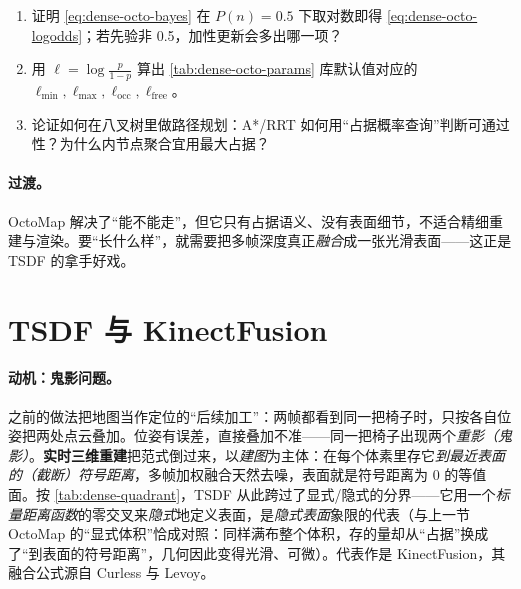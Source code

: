 \begin{practice}[练习]
\begin{enumerate}
  \item 证明 \cref{eq:dense-octo-bayes} 在 $P(n)=0.5$ 下取对数即得 \cref{eq:dense-octo-logodds}；若先验非 0.5，加性更新会多出哪一项？
  \item 用 $\ell=\log\frac{p}{1-p}$ 算出 \cref{tab:dense-octo-params} 库默认值对应的 $\ell_{\min},\ell_{\max},\ell_{\mathrm{occ}},\ell_{\mathrm{free}}$。
  \item 论证如何在八叉树里做路径规划：A*/RRT 如何用“占据概率查询”判断可通过性？为什么内节点聚合宜用最大占据？
\end{enumerate}
\end{practice}

\paragraph{过渡。}
OctoMap 解决了“能不能走”，但它只有占据语义、没有表面细节，不适合精细重建与渲染。要“长什么样”，就需要把多帧深度真正\emph{融合}成一张光滑表面——这正是 TSDF 的拿手好戏。

\section{TSDF 与 KinectFusion}
\label{sec:dense-tsdf}

\paragraph{动机：鬼影问题。}
之前的做法把地图当作定位的“后续加工”：两帧都看到同一把椅子时，只按各自位姿把两处点云叠加。位姿有误差，直接叠加不准——同一把椅子出现两个\emph{重影（鬼影）}\cite{gaoxiang2019slam14}。\textbf{实时三维重建}把范式倒过来，以\emph{建图}为主体：在每个体素里存它\emph{到最近表面的（截断）符号距离}，多帧加权融合天然去噪，表面就是符号距离为 0 的等值面。按 \cref{tab:dense-quadrant}，TSDF 从此跨过了显式/隐式的分界——它用一个\emph{标量距离函数}的零交叉来\emph{隐式}地定义表面，是\emph{隐式表面}象限的代表（与上一节 OctoMap 的“显式体积”恰成对照：同样满布整个体积，存的量却从“占据”换成了“到表面的符号距离”，几何因此变得光滑、可微）。代表作是 KinectFusion\cite{newcombe2011kinectfusion}，其融合公式源自 Curless 与 Levoy\cite{curless1996volumetric}。

